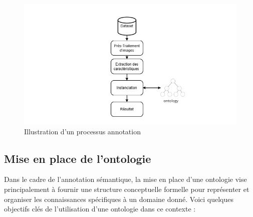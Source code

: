 \documentclass{article}
\begin{document}
	\begin{figure}[htbp]
		\begin{center}
			\begin{minipage}[b]{0.7\textwidth}
				\centering
				\includegraphics[width=\textwidth]{img/14.png}
				\caption{Illustration d'un processus annotation}
			\end{minipage}
		\end{center}
	\end{figure}
	
	\subsection{Mise en place de l'ontologie}
	Dans le cadre de l'annotation sémantique, la mise en place d'une ontologie vise principalement à fournir une structure conceptuelle formelle pour représenter et organiser les connaissances spécifiques à un domaine donné. Voici quelques objectifs clés de l'utilisation d'une ontologie dans ce contexte :
	
\end{document}
